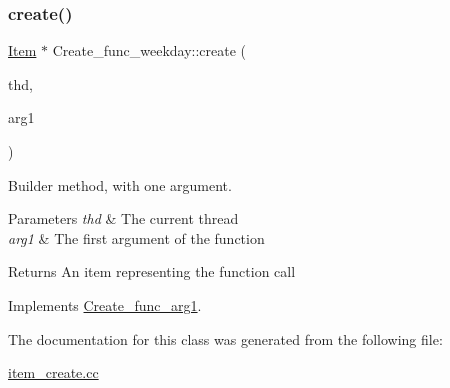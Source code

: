 \subsubsection{\texorpdfstring{create()}{create()}}
{\footnotesize\ttfamily \mbox{\hyperlink{classItem}{Item}} $\ast$ Create\+\_\+func\+\_\+weekday\+::create (\begin{DoxyParamCaption}\item[{T\+HD $\ast$}]{thd,  }\item[{\mbox{\hyperlink{classItem}{Item}} $\ast$}]{arg1 }\end{DoxyParamCaption})\hspace{0.3cm}{\ttfamily [virtual]}}

Builder method, with one argument. 
\begin{DoxyParams}{Parameters}
{\em thd} & The current thread \\
\hline
{\em arg1} & The first argument of the function \\
\hline
\end{DoxyParams}
\begin{DoxyReturn}{Returns}
An item representing the function call 
\end{DoxyReturn}


Implements \mbox{\hyperlink{classCreate__func__arg1_a3e9a98f755cd82c3e762e334c955a8c9}{Create\+\_\+func\+\_\+arg1}}.



The documentation for this class was generated from the following file\+:\begin{DoxyCompactItemize}
\item 
\mbox{\hyperlink{item__create_8cc}{item\+\_\+create.\+cc}}\end{DoxyCompactItemize}
